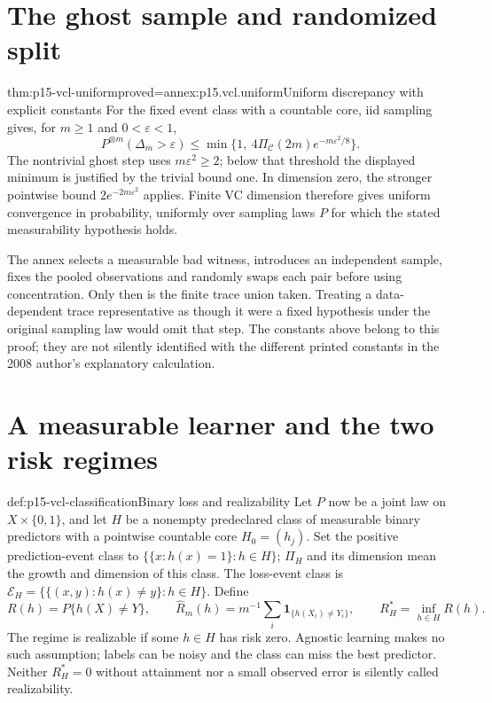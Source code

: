 \section{The ghost sample and randomized split}
\label{sec:p15-vcl-uniform}

\begin{hbtheorem}{thm:p15-vcl-uniform}{proved=annex:p15.vcl.uniform}{Uniform discrepancy with explicit constants}
For the fixed event class with a countable core, iid sampling gives, for
\(m\geq1\) and \(0<\varepsilon<1\),
\[
 P^{\otimes m}(\Delta_m>\varepsilon)
 \leq\min\{1,\ 4\Pi_{\mathcal C}(2m)e^{-m\varepsilon^2/8}\}.
\]
The nontrivial ghost step uses \(m\varepsilon^2\geq2\); below that
threshold the displayed minimum is justified by the trivial bound one.
In dimension zero, the stronger pointwise bound
\(2e^{-2m\varepsilon^2}\) applies. Finite VC dimension therefore gives
uniform convergence in probability, uniformly over sampling laws \(P\)
for which the stated measurability hypothesis holds.
\end{hbtheorem}

The annex selects a measurable bad witness, introduces an independent
sample, fixes the pooled observations and randomly swaps each pair before
using concentration. Only then is the finite trace union taken. Treating
a data-dependent trace representative as though it were a fixed hypothesis
under the original sampling law would omit that step. The constants above
belong to this proof; they are not silently identified with the different
printed constants in the 2008 author's explanatory calculation.

\section{A measurable learner and the two risk regimes}
\label{sec:p15-vcl-learning}

\begin{hbdefinition}{def:p15-vcl-classification}{Binary loss and realizability}
Let \(P\) now be a joint law on \(X\times\{0,1\}\), and let
\(H\) be a nonempty predeclared class of measurable binary predictors
with a pointwise countable core \(H_0=(h_j)\). Set
the positive prediction-event class to \(\{\{x:h(x)=1\}:h\in H\}\);
\(\Pi_H\) and its dimension mean the growth and dimension of this class.
The loss-event class is
\(\mathcal E_H=\{\{(x,y):h(x)\ne y\}:h\in H\}\). Define
\[
 R(h)=P\{h(X)\ne Y\},\qquad
 \widehat R_m(h)=m^{-1}\sum_i\mathbf1_{\{h(X_i)\ne Y_i\}},\qquad
 R_H^*=\inf_{h\in H}R(h).
\]
The regime is realizable if some \(h\in H\) has risk zero. Agnostic
learning makes no such assumption; labels can be noisy and the class can
miss the best predictor. Neither \(R_H^*=0\) without attainment nor a
small observed error is silently called realizability.
\end{hbdefinition}

